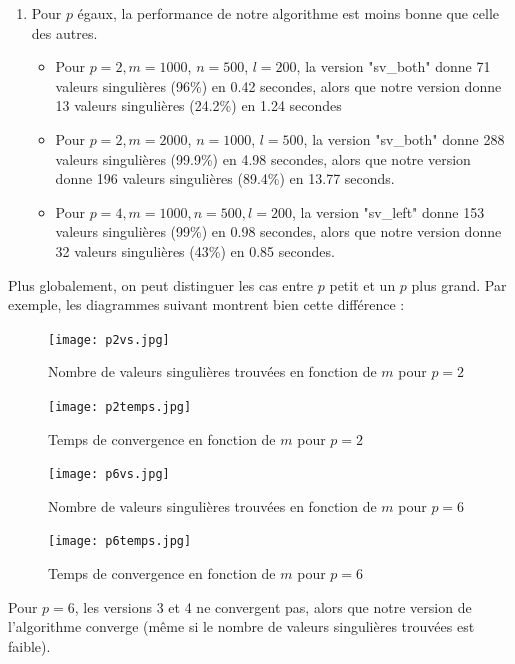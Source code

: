 \documentclass[fleqn]{article}
\begin{document}
\begin{enumerate}
  \item Pour $p$ égaux, la performance de notre algorithme est moins bonne que celle des autres.
    \begin{itemize} 
      \item Pour $p=2, m=1000$, $n=500$, $l=200$, la version "sv\_both" donne 71 valeurs singulières (96\%) en 0.42 secondes, alors que notre version donne 13 valeurs singulières (24.2\%) en 1.24 secondes
      \item Pour $p=2, m=2000$, $n=1000$, $l=500$, la version "sv\_both" donne 288 valeurs singulières (99.9\%) en 4.98 secondes, alors que notre version donne 196 valeurs singulières (89.4\%) en 13.77 seconds.
      \item Pour $p=4, m=1000, n=500, l=200$, la version "sv\_left" donne 153 valeurs singulières (99\%) en 0.98 secondes, alors que notre version donne 32 valeurs singulières (43\%) en 0.85 secondes.
    \end{itemize}
\end{enumerate}

Plus globalement, on peut distinguer les cas entre $p$ petit et un $p$ plus grand. Par exemple, les diagrammes suivant montrent bien cette différence :

\begin{figure}[h]
\centering
\texttt{[image: p2vs.jpg]}
\caption{Nombre de valeurs singulières trouvées en fonction de $m$ pour $p=2$}
\end{figure}

\begin{figure}[h]
\centering
\texttt{[image: p2temps.jpg]}
\caption{Temps de convergence en fonction de $m$ pour $p=2$}
\end{figure}

\pagebreak

\begin{figure}[h]
\centering
\texttt{[image: p6vs.jpg]}
\caption{Nombre de valeurs singulières trouvées en fonction de $m$ pour $p=6$}
\end{figure}

\begin{figure}[h]
\centering
\texttt{[image: p6temps.jpg]}
\caption{Temps de convergence en fonction de $m$ pour $p=6$}
\end{figure}

Pour $p=6$, les versions 3 et 4 ne convergent pas, alors que notre version de l'algorithme converge (même si le nombre de valeurs singulières trouvées est faible). 
\end{document}
